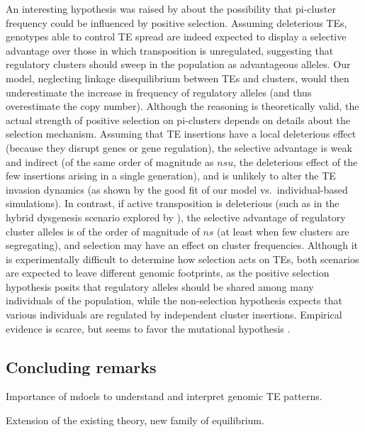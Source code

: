 \documentclass[10pt,a4paper]{article}
\begin{document}
An interesting hypothesis was raised by \cite{Kel18} about the possibility that pi-cluster frequency could be influenced by positive selection. Assuming deleterious TEs, genotypes able to control TE spread are indeed expected to display a selective advantage over those in which transposition is unregulated, suggesting that regulatory clusters should sweep in the population as advantageous alleles. Our model, neglecting linkage disequilibrium between TEs and clusters, would then underestimate the increase in frequency of regulatory alleles (and thus overestimate the copy number). Although the reasoning is theoretically valid, the actual strength of positive selection on pi-clusters depends on details about the selection mechanism. Assuming that TE insertions have a local deleterious effect (because they disrupt genes or gene regulation), the selective advantage is weak and indirect (of the same order of magnitude as $n s u$, the deleterious effect of the few insertions arising in a single generation), and is unlikely to alter the TE invasion dynamics (as shown by the good fit of our model vs.\ individual-based simulations). In contrast, if active transposition is deleterious (such as in the hybrid dysgenesis scenario explored by \cite{Kel18}), the selective advantage of regulatory cluster alleles is of the order of magnitude of $n s$ (at least when few clusters are segregating), and selection may have an effect on cluster frequencies. Although it is experimentally difficult to determine how selection acts on TEs, both scenarios are expected to leave different genomic footprints, as the positive selection hypothesis posits that regulatory alleles should be shared among many individuals of the population, while the non-selection hypothesis expects that various individuals are regulated by independent cluster insertions. Empirical evidence is scarce, but seems to favor the mutational hypothesis \cite{ZPK20}. 

\subsection{Concluding remarks}

Importance of mdoels to understand and interpret genomic TE patterns. 

Extension of the existing theory, new family of equilibrium. 


\printbibliography


\newpage 
\end{document}
